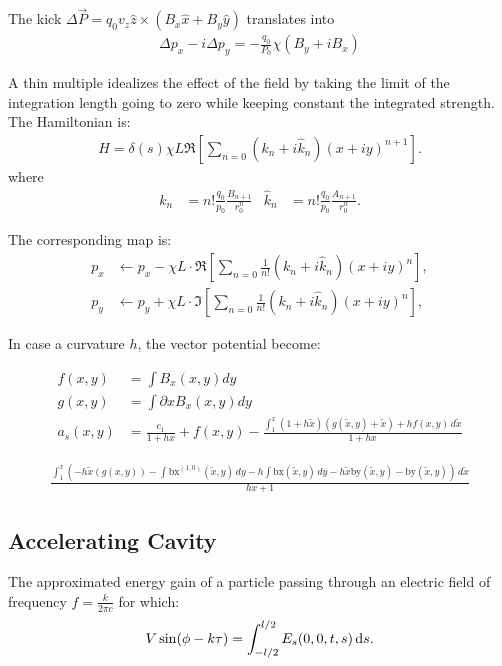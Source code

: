 The kick $\Delta \vec P  = q_0 v_z \hat z \times (B_x \hat x + B_y \hat y)$ translates into
\begin{align}
   \Delta p_x - i \Delta p_y = -\frac{q_0}{P_0}\chi(B_y + i B_x) 
\end{align}


A thin multiple idealizes the effect of the field by taking the limit of the integration 
length going to zero while keeping constant the integrated strength. The Hamiltonian is:
\begin{align}
  H= \delta(s) \chi L \Re\left[\sum_{n=0} (k_n + i\hat k_n) (x+iy)^{n+1} \right].
\end{align}
where
\begin{align}
  k_n     &=  n!\frac{q_0}{p_0}  \frac{B_{n+1}}{r_0^n}  &
  \hat k_n&=  n!\frac{q_0}{p_0}  \frac{A_{n+1}}{r_0^n} .
\end{align}


The corresponding map is:
\begin{align}
  p_x &\leftarrow p_x - \chi L\cdot\Re\left[\sum_{n=0} \frac{1}{n!} (k_n + i\hat k_n) (x+iy)^n \right], \\
  p_y &\leftarrow p_y + \chi L\cdot\Im\left[\sum_{n=0} \frac{1}{n!} (k_n + i\hat k_n) (x+iy)^n \right],
\end{align}

In case a curvature $h$, the vector potential become:

\begin{align}
f(x,y)&=\int B_x(x,y) dy  \\
g(x,y)&=\int \partial x  B_x(x,y) dy \\
a_s(x,y)&=\frac{c_1}{1 + h x} + f(x,y) -
   \frac{\int_1^x (1 + h \tilde{x}) (g(\tilde{x},y)+\tilde{x}) +h f(x,y)  \, d\tilde{x}}{1+ h x}
\end{align}

\begin{align}
\frac{\int_1^x \left(-h \tilde{x} \left(g(x,y)\right)-\int \text{bx}^{(1,0)}(\tilde{x},y) \, dy-h \int \text{bx}(\tilde{x},y) \,
   dy-h \tilde{x} \text{by}(\tilde{x},y)-\text{by}(\tilde{x},y)\right) \, d\tilde{x}}{h x+1}
\end{align}



\subsection{Accelerating Cavity}

The approximated energy gain of a particle passing through an electric field of frequency $f=\frac{k}{2\pi c}$ for which:
\begin{align}
V \sin(\phi - k \tau) = \int_{-l/2}^{l/2} E_s(0,0,t,s)  {\rm \,d}s.
\end{align}

